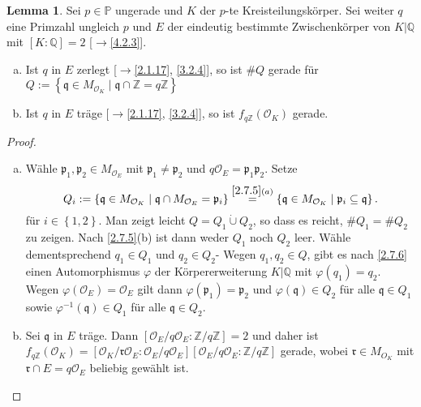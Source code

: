 \documentclass[
twoside=semi,
fontsize=12,
DIV=12, 
cleardoublepage=current,
leqno,
headings=optiontoheadandtoc, 
toc=idx
]{scrbook}
\newcommand{\Z}{\mathbb{Z}}
\newcommand{\Q}{\mathbb{Q}}
\renewcommand{\P}{\mathbb{P}}
\newcommand{\set}[1]{\left\{ #1 \right\}}
\theoremstyle{definition}
\newtheorem{lemma}[definition]{Lemma}
\begin{document}
 	\begin{lemma}\label{4.3.5}\hfill\newline
 		Sei $p \in \P$ ungerade und $K$ der $p$-te Kreisteilungsk\"orper. Sei weiter $q$ eine Primzahl ungleich $p$
 		und $E$ der eindeutig bestimmte Zwischenk\"orper von $K|\Q$ mit $[K:\Q] = 2$ [$\to$\ref{4.2.3}].
 		\begin{enumerate}[(a)]
 			\item Ist $q$ in $E$ zerlegt [$\to$\ref{2.1.17}, \ref{3.2.4}], so ist $\#Q$ gerade f\"ur $Q := \set{\mathfrak{q} \in M_{\mathcal{O}_K} \mid \mathfrak{q} \cap \Z = q\Z}$
 			\item Ist $q$ in $E$ tr\"age [$\to$\ref{2.1.17}, \ref{3.2.4}], so ist $f_{q\Z}(\mathcal{O}_K)$ gerade.
		\end{enumerate}
		
		\begin{proof}\hfill
			\begin{enumerate}[(a)]
				\item W\"ahle $\mathfrak{p}_1, \mathfrak{p}_2 \in M_{\mathcal{O}_E}$ mit $\mathfrak{p}_1 \neq \mathfrak{p}_2$ und $q\mathcal{O}_E = \mathfrak{p}_1\mathfrak{p}_2$. Setze
					\[Q_i := \set{\mathfrak{q} \in M_{\mathcal{O}_K} \mid \mathfrak{q} \cap M_{\mathcal{O}_E} = \mathfrak{p}_i} \overset{\ref{2.7.5}(a)}{=} \set{\mathfrak{q} \in M_{\mathcal{O}_K} \mid \mathfrak{p}_i \subseteq \mathfrak{q} }.\]
				f\"ur $i \in \set{1, 2}$. Man zeigt leicht $Q = Q_1 \dot\cup Q_2$, so dass es reicht, $\#Q_1 = \#Q_2$ zu zeigen. Nach \ref{2.7.5}(b) ist dann weder $Q_1$ noch $Q_2$ leer.
				W\"ahle dementsprechend $q_1 \in Q_1$ und $q_2 \in Q_2$- Wegen $q_1, q_2 \in Q$, gibt es nach \ref{2.7.6} einen Automorphismus $\varphi$ der K\"orpererweiterung $K|\Q$ mit $\varphi(q_1) = q_2$. Wegen $\varphi(\mathcal{O}_E) = \mathcal{O}_E$ gilt dann $\varphi(\mathfrak{p}_1) = \mathfrak{p}_2$ und $\varphi(\mathfrak{q}) \in Q_2$ f\"ur alle $\mathfrak{q} \in Q_1$ sowie
				$\varphi^{-1}(\mathfrak{q}) \in Q_1 $ f\"ur alle $\mathfrak{q} \in Q_2$.
				
				\item Sei $\mathfrak{q}$ in $E$ tr\"age. Dann $[\mathcal{O}_E/q\mathcal{O}_E : \Z/q\Z] = 2$ und daher ist \linebreak $f_{q\Z}(\mathcal{O}_K) = [\mathcal{O}_K/\mathfrak{r}\mathcal{O}_E: \mathcal{O}_E/q\mathcal{O}_E][\mathcal{O}_E/q\mathcal{O}_E: \Z/q\Z]$ gerade, wobei $\mathfrak{r} \in M_{O_K}$ mit $\mathfrak{r} \cap E = q\mathcal{O}_E$ beliebig gew\"ahlt ist.
			\end{enumerate}
		\end{proof}
 	\end{lemma}
 
\end{document}
